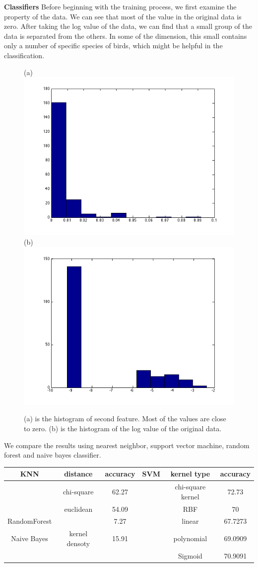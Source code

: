 \documentclass{article} %
\begin{document}
\textbf{Classifiers}
Before beginning with the training process, we first examine the property of the data. We can see that most of the value in the original data is zero. After taking the log value of the data, we can find that a small group of the data is separated from the others. In some of the dimension, this small contains only a number of specific species of birds, which might be helpful in the classification.
\begin{figure}[ht!]
    \centering
    {(a)\includegraphics[width=0.45\linewidth]{./Figure/Train_features.png}
    (b)\includegraphics[width=0.45\linewidth]{./Figure/Train_features_log.png}}
    \caption{(a) is the histogram of second feature. Most of the values are close to zero. (b) is the histogram of the log value of the original data.}
    \label{fig:hist}
\end{figure}


We compare the results using nearest neighbor, support vector machine, random forest and naive bayes classifier.


\begin{center}
\begin{small}
\begin{tabular}{|c|c|c|c|c|c|}
\hline
    KNN & distance      &accuracy   &SVM    & kernel type       &accuracy\\
\hline
        & chi-square    &62.27      &       &chi-square kernel  &72.73\\
\hline
        & euclidean     &54.09      &       & RBF               &70\\
\hline
RandomForest &         & 7.27           &       & linear            &67.7273\\
\hline
Naive Bayes  & kernel densoty  & 15.91           &       & polynomial        &69.0909\\
\hline
        &               &           &       & Sigmoid           &70.9091\\
\hline
\end{tabular}
\end{small}
\end{center}
\end{document}
